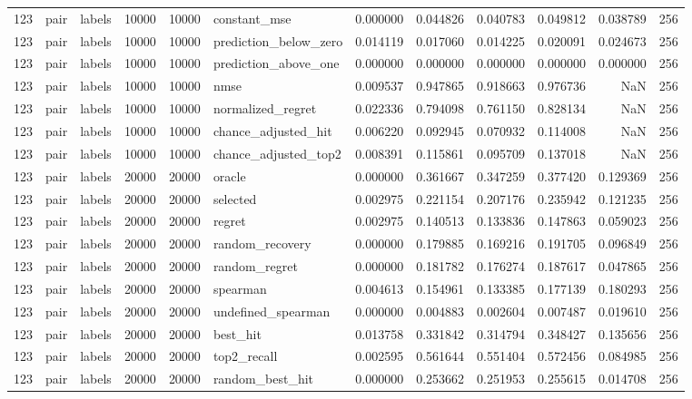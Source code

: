 \begin{tabular}{rllrrlrrrrrr}
123 & pair & labels & 10000 & 10000 & constant_mse & 0.000000 & 0.044826 & 0.040783 & 0.049812 & 0.038789 & 256 \\
123 & pair & labels & 10000 & 10000 & prediction_below_zero & 0.014119 & 0.017060 & 0.014225 & 0.020091 & 0.024673 & 256 \\
123 & pair & labels & 10000 & 10000 & prediction_above_one & 0.000000 & 0.000000 & 0.000000 & 0.000000 & 0.000000 & 256 \\
123 & pair & labels & 10000 & 10000 & nmse & 0.009537 & 0.947865 & 0.918663 & 0.976736 & NaN & 256 \\
123 & pair & labels & 10000 & 10000 & normalized_regret & 0.022336 & 0.794098 & 0.761150 & 0.828134 & NaN & 256 \\
123 & pair & labels & 10000 & 10000 & chance_adjusted_hit & 0.006220 & 0.092945 & 0.070932 & 0.114008 & NaN & 256 \\
123 & pair & labels & 10000 & 10000 & chance_adjusted_top2 & 0.008391 & 0.115861 & 0.095709 & 0.137018 & NaN & 256 \\
123 & pair & labels & 20000 & 20000 & oracle & 0.000000 & 0.361667 & 0.347259 & 0.377420 & 0.129369 & 256 \\
123 & pair & labels & 20000 & 20000 & selected & 0.002975 & 0.221154 & 0.207176 & 0.235942 & 0.121235 & 256 \\
123 & pair & labels & 20000 & 20000 & regret & 0.002975 & 0.140513 & 0.133836 & 0.147863 & 0.059023 & 256 \\
123 & pair & labels & 20000 & 20000 & random_recovery & 0.000000 & 0.179885 & 0.169216 & 0.191705 & 0.096849 & 256 \\
123 & pair & labels & 20000 & 20000 & random_regret & 0.000000 & 0.181782 & 0.176274 & 0.187617 & 0.047865 & 256 \\
123 & pair & labels & 20000 & 20000 & spearman & 0.004613 & 0.154961 & 0.133385 & 0.177139 & 0.180293 & 256 \\
123 & pair & labels & 20000 & 20000 & undefined_spearman & 0.000000 & 0.004883 & 0.002604 & 0.007487 & 0.019610 & 256 \\
123 & pair & labels & 20000 & 20000 & best_hit & 0.013758 & 0.331842 & 0.314794 & 0.348427 & 0.135656 & 256 \\
123 & pair & labels & 20000 & 20000 & top2_recall & 0.002595 & 0.561644 & 0.551404 & 0.572456 & 0.084985 & 256 \\
123 & pair & labels & 20000 & 20000 & random_best_hit & 0.000000 & 0.253662 & 0.251953 & 0.255615 & 0.014708 & 256 \\

\end{tabular}
